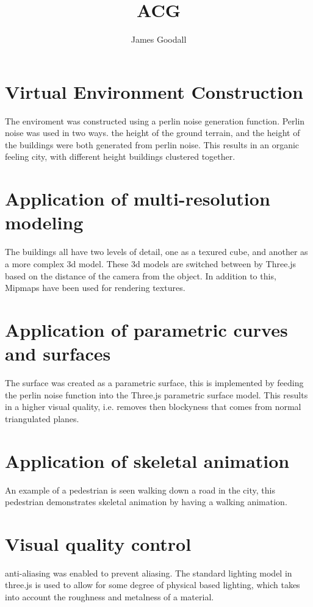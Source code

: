 \documentclass{article}
\title{ACG}
\author{James Goodall}
\date{}
\begin{document}
\maketitle

\section{Virtual Environment Construction}

The enviroment was constructed using a perlin noise generation function.
Perlin noise was used in two ways.
the height of the ground terrain, and the height of the buildings were both generated from perlin noise.
This results in an organic feeling city, with different height buildings clustered together.

\section{Application of multi-resolution modeling}

The buildings all have two levels of detail, one as a texured cube, and another as a more complex 3d model.
These 3d models are switched between by Three.js based on the distance of the camera from the object.
In addition to this, Mipmaps have been used for rendering textures.

\section{Application of parametric curves and surfaces}

The surface was created as a parametric surface, this is implemented by feeding the perlin noise function into the Three.js parametric surface model.
This results in a higher visual quality, i.e. removes then blockyness that comes from normal triangulated planes.

\section{Application of skeletal animation}

An example of a pedestrian is seen walking down a road in the city,
this pedestrian demonstrates skeletal animation by having a walking animation.

\section{Visual quality control}

anti-aliasing was enabled to prevent aliasing.
The standard lighting model in three.js is used to allow for some degree of physical based lighting, which takes into account the roughness and metalness of a material.
\end{document}
